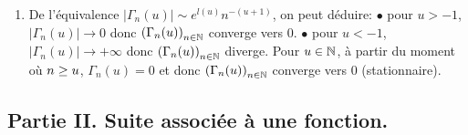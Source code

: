 \begin{enumerate}
\begin{enumerate}
\item De l'équivalence $ \left|\Gamma_n(u)\right|\sim e^{l(u)}n^{-(u+1)}$, on peut déduire: \newline
$\bullet$ pour $u>-1$, $\left|\Gamma_n(u)\right|\to 0$ donc  
 $\left( \Gamma_n(u)\right)_{n\in \mathbb{N}}$ converge vers $0$.\newline
 $\bullet$ pour $u<-1$, $\left|\Gamma_n(u)\right|\to +\infty$ donc  
 $\left( \Gamma_n(u)\right)_{n\in \mathbb{N}}$ diverge.\newline
Pour $u\in\mathbb{N}$, à partir du moment où $n\geq u$, $\Gamma_n(u)=0$ et donc $\left( \Gamma_n(u)\right)_{n\in \mathbb{N}}$ converge vers $0$ (stationnaire).
\end{enumerate}
\end{enumerate}

\subsection*{Partie II. Suite associée à une fonction.}
